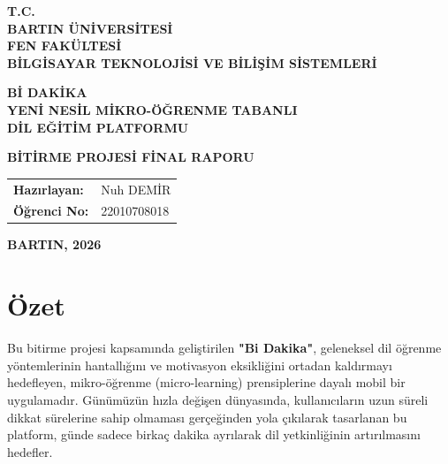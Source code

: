 \documentclass[12pt,a4paper]{report}
\begin{document}
\begin{titlepage}
    \begin{center}
        \vspace*{0.5cm}
        \Large\textbf{T.C.}\\
        \Large\textbf{BARTIN ÜNİVERSİTESİ}\\
        \large\textbf{FEN FAKÜLTESİ}\\
        \large\textbf{BİLGİSAYAR TEKNOLOJİSİ VE BİLİŞİM SİSTEMLERİ}
        
        \vspace{4cm}
        
        \Huge \textbf{Bİ DAKİKA}\\
        \Large \textbf{YENİ NESİL MİKRO-ÖĞRENME TABANLI}\\
        \Large \textbf{DİL EĞİTİM PLATFORMU}
        
        \vspace{3cm}
        
        \Large \textbf{BİTİRME PROJESİ FİNAL RAPORU}
        
        \vspace{3cm}
        
        \begin{tabular}{ll}
            \textbf{Hazırlayan:} & Nuh DEMİR \\
            \textbf{Öğrenci No:} & 22010708018
        \end{tabular}
        
        \vfill
        
        \Large \textbf{BARTIN, 2026}
        
    \end{center}
\end{titlepage}

\chapter*{Özet}

Bu bitirme projesi kapsamında geliştirilen \textbf{"Bi Dakika"}, geleneksel dil öğrenme yöntemlerinin hantallığını ve motivasyon eksikliğini ortadan kaldırmayı hedefleyen, mikro-öğrenme (micro-learning) prensiplerine dayalı mobil bir uygulamadır. Günümüzün hızla değişen dünyasında, kullanıcıların uzun süreli dikkat sürelerine sahip olmaması gerçeğinden yola çıkılarak tasarlanan bu platform, günde sadece birkaç dakika ayrılarak dil yetkinliğinin artırılmasını hedefler.
\end{document}
